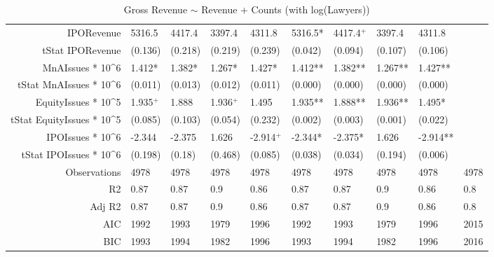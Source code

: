 \begin{table}[ht]
\begin{tabular}{rlllllllll}
  IPORevenue & 5316.5 & 4417.4 & 3397.4 & 4311.8 & 5316.5* & 4417.4$^{+}$ & 3397.4 & 4311.8 &  \\ 
  tStat IPORevenue & (0.136) & (0.218) & (0.219) & (0.239) & (0.042) & (0.094) & (0.107) & (0.106) &  \\ 
  MnAIssues * 10^6 & 1.412* & 1.382* & 1.267* & 1.427* & 1.412** & 1.382** & 1.267** & 1.427** &  \\ 
  tStat MnAIssues * 10^6 & (0.011) & (0.013) & (0.012) & (0.011) & (0.000) & (0.000) & (0.000) & (0.000) &  \\ 
  EquityIssues * 10^5 & 1.935$^{+}$ & 1.888 & 1.936$^{+}$ & 1.495 & 1.935** & 1.888** & 1.936** & 1.495* &  \\ 
  tStat EquityIssues * 10^5 & (0.085) & (0.103) & (0.054) & (0.232) & (0.002) & (0.003) & (0.001) & (0.022) &  \\ 
  IPOIssues * 10^6 & -2.344 & -2.375 & 1.626 & -2.914$^{+}$ & -2.344* & -2.375* & 1.626 & -2.914** &  \\ 
  tStat IPOIssues * 10^6 & (0.198) & (0.18) & (0.468) & (0.085) & (0.038) & (0.034) & (0.194) & (0.006) &  \\ 
  Observations & 4978 & 4978 & 4978 & 4978 & 4978 & 4978 & 4978 & 4978 & 4978 \\ 
  R2 & 0.87 & 0.87 & 0.9 & 0.86 & 0.87 & 0.87 & 0.9 & 0.86 & 0.8 \\ 
  Adj R2 & 0.87 & 0.87 & 0.9 & 0.86 & 0.87 & 0.87 & 0.9 & 0.86 & 0.8 \\ 
  AIC & 1992 & 1993 & 1979 & 1996 & 1992 & 1993 & 1979 & 1996 & 2015 \\ 
  BIC & 1993 & 1994 & 1982 & 1996 & 1993 & 1994 & 1982 & 1996 & 2016 \\ 
   \hline
\end{tabular}
\caption{Gross Revenue $\sim$ Revenue + Counts (with log(Lawyers))} 
\end{table}
